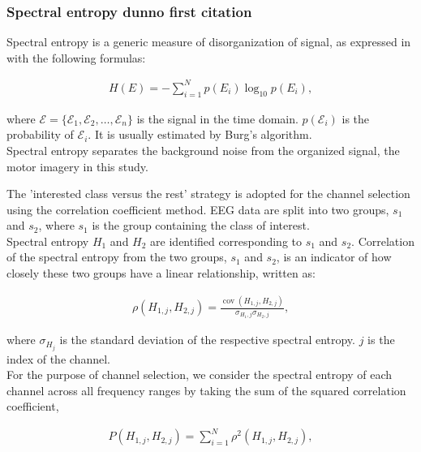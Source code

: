 \documentclass{Configuration_Files/PoliMi3i_thesis}
\begin{document}
\subsubsection{Spectral entropy dunno first citation}

Spectral entropy is a generic measure of disorganization of signal, as expressed in \cite{yangEEGChannelSelection2018b} with the following formulas:

\begin{align}
H(E)=-\sum_{i=1}^N p\left(E_i\right) \log _{10} p\left(E_i\right),
\end{align}

where \( \mathcal{E} = \{ \mathcal{E}_1, \mathcal{E}_2, \ldots, \mathcal{E}_n \} \) is the signal in the time domain. \( p(\mathcal{E}_i) \) is the probability of \( \mathcal{E}_i \). It is usually estimated by Burg's algorithm. \cite{schalkBCI2000GeneralpurposeBraincomputer2004} \\
Spectral entropy separates the background noise from the organized signal, the motor imagery in this study.

The 'interested class versus the rest' strategy is adopted for the channel selection using the correlation coefficient method. EEG data are split into two groups, \( s_1 \) and \( s_2 \), where \( s_1 \) is the group containing the class of interest. \\
Spectral entropy \( H_1 \) and \( H_2 \) are identified corresponding to \( s_1 \) and \( s_2 \). Correlation of the spectral entropy from the two groups, \( s_1 \) and \( s_2 \), is an indicator of how closely these two groups have a linear relationship, written as:

\begin{align}
\rho\left(H_{1, j}, H_{2, j}\right)=\frac{\operatorname{cov}\left(H_{1, j}, H_{2, j}\right)}{\sigma_{H_1, j} \sigma_{H_2, j}},
\end{align}

where \( \sigma_{H_j} \) is the standard deviation of the respective spectral entropy. \( j \) is the index of the channel. \\
 For the purpose of channel selection, we consider the spectral entropy of each channel across all frequency ranges by taking the sum of the squared correlation coefficient,

\begin{align}
P\left(H_{1, j}, H_{2, j}\right)=\sum_{i=1}^N \rho^2\left(H_{1, j}, H_{2, j}\right),
\end{align}
\end{document}

